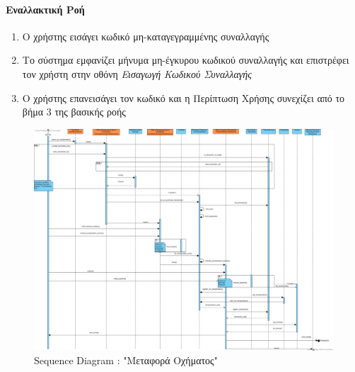 \documentclass{../ol-softwaremanual}
\begin{document}
	\paragraph{Εναλλακτική Ροή}
	\begin{enumerate}
		\item Ο χρήστης εισάγει κωδικό μη-καταγεγραμμένης συναλλαγής
		\item Το σύστημα εμφανίζει μήνυμα μη-έγκυρου κωδικού συναλλαγής και επιστρέφει τον χρήστη στην οθόνη \textit{Εισαγωγή Κωδικού Συναλλαγής} 
		\item Ο χρήστης επανεισάγει τον κωδικό και η Περίπτωση Χρήσης συνεχίζει από το βήμα 3 της βασικής ροής
	\end{enumerate}
	
	\begin{figure}[htbp!]
		\centering
		\includegraphics[scale=0.21]{img/seq_car_transport.png}
		\caption{\en Sequence Diagram : "\gr Μεταφορά Οχήματος\en"\gr}
	\end{figure}
	
	
	
	
	
	
	
	
	
	
\end{document}
